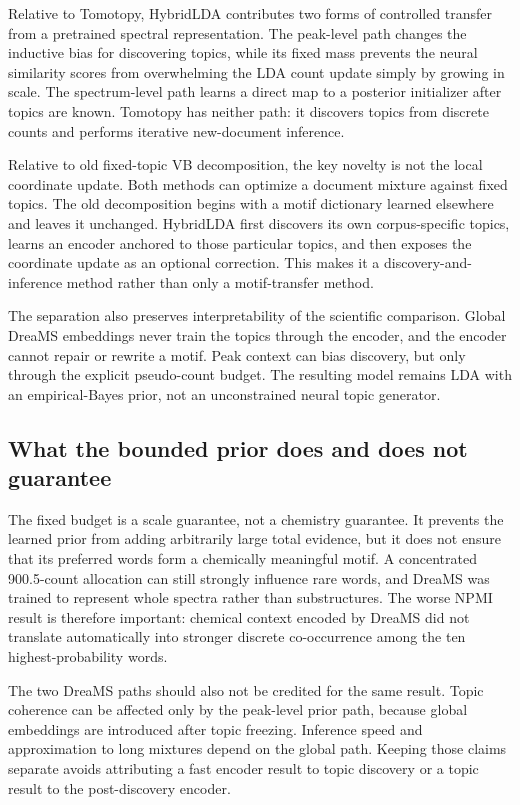 \documentclass[11pt]{article}
\begin{document}
Relative to Tomotopy, HybridLDA contributes two forms of controlled transfer
from a pretrained spectral representation. The peak-level path changes the
inductive bias for discovering topics, while its fixed mass prevents the
neural similarity scores from overwhelming the LDA count update simply by
growing in scale. The spectrum-level path learns a direct map to a posterior
initializer after topics are known. Tomotopy has neither path: it discovers
topics from discrete counts and performs iterative new-document inference.

Relative to old fixed-topic VB decomposition, the key novelty is not the local
coordinate update. Both methods can optimize a document mixture against fixed
topics. The old decomposition begins with a motif dictionary learned
elsewhere and leaves it unchanged. HybridLDA first discovers its own
corpus-specific topics, learns an encoder anchored to those particular topics,
and then exposes the coordinate update as an optional correction. This makes
it a discovery-and-inference method rather than only a motif-transfer method.

The separation also preserves interpretability of the scientific comparison.
Global DreaMS embeddings never train the topics through the encoder, and the
encoder cannot repair or rewrite a motif. Peak context can bias discovery, but
only through the explicit pseudo-count budget. The resulting model remains LDA
with an empirical-Bayes prior, not an unconstrained neural topic generator.

\subsection{What the bounded prior does and does not guarantee}

The fixed budget is a scale guarantee, not a chemistry guarantee. It prevents
the learned prior from adding arbitrarily large total evidence, but it does not
ensure that its preferred words form a chemically meaningful motif. A
concentrated 900.5-count allocation can still strongly influence rare words,
and DreaMS was trained to represent whole spectra rather than substructures.
The worse NPMI result is therefore important: chemical context encoded by
DreaMS did not translate automatically into stronger discrete co-occurrence
among the ten highest-probability words.

The two DreaMS paths should also not be credited for the same result. Topic
coherence can be affected only by the peak-level prior path, because global
embeddings are introduced after topic freezing. Inference speed and
approximation to long mixtures depend on the global path. Keeping those claims
separate avoids attributing a fast encoder result to topic discovery or a topic
result to the post-discovery encoder.
\end{document}
